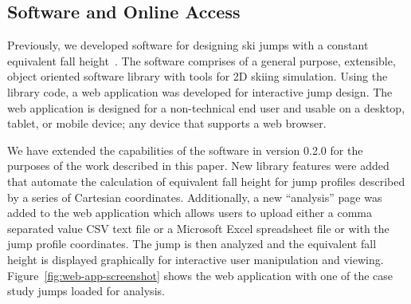 \documentclass{article}
\begin{document}
\subsection{Software and Online Access}
%
Previously, we developed software for designing ski jumps with a constant
equivalent fall height~\cite{Moore2018}. The software comprises of a general
purpose, extensible, object oriented software library with tools for 2D skiing
simulation. Using the library code, a web application was developed for
interactive jump design. The web application is designed for a non-technical
end user and usable on a desktop, tablet, or mobile device; any device that
supports a web browser.

We have extended the capabilities of the software in version 0.2.0 for the
purposes of the work described in this paper. New library features were added
that automate the calculation of equivalent fall height for jump profiles
described by a series of Cartesian coordinates.
Additionally, a new
``analysis'' page was added to the web application which allows users to upload
either a comma separated value CSV text file or a Microsoft Excel spreadsheet
file or with the jump profile coordinates. The jump is then analyzed and the
equivalent fall height is displayed graphically for interactive user
manipulation and viewing. Figure~\ref{fig:web-app-screenshot} shows the web
application with one of the case study jumps loaded for analysis.
%
\end{document}
